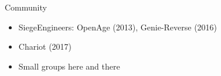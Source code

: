 \documentclass{beamer}
\begin{document}

\begin{frame}{Community}
	\begin{itemize}
		\item SiegeEngineers: OpenAge (2013), Genie-Reverse (2016)
		\item Chariot (2017)
		\item Small groups here and there
	\end{itemize}

\end{frame}

%
%
%
%
%
%
%
%
%
%
\end{document}
